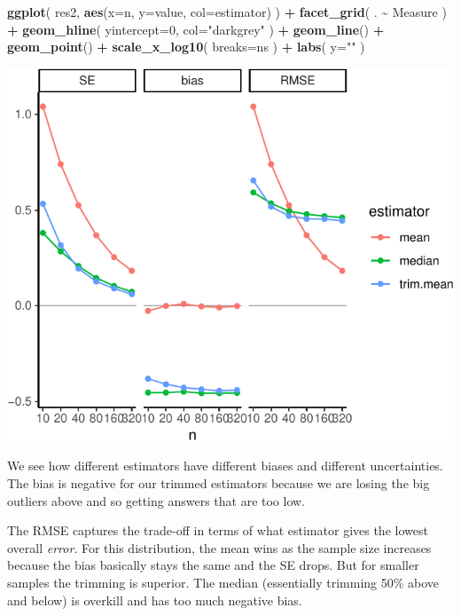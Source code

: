 \documentclass[
]{book}
\newenvironment{Shaded}{\begin{snugshade}}{\end{snugshade}}
\newcommand{\AttributeTok}[1]{\textcolor[rgb]{0.13,0.29,0.53}{#1}}
\newcommand{\DecValTok}[1]{\textcolor[rgb]{0.00,0.00,0.81}{#1}}
\newcommand{\FunctionTok}[1]{\textcolor[rgb]{0.13,0.29,0.53}{\textbf{#1}}}
\newcommand{\NormalTok}[1]{#1}
\newcommand{\SpecialCharTok}[1]{\textcolor[rgb]{0.81,0.36,0.00}{\textbf{#1}}}
\newcommand{\StringTok}[1]{\textcolor[rgb]{0.31,0.60,0.02}{#1}}
\begin{document}
\begin{Shaded}
\begin{Highlighting}[]
\FunctionTok{ggplot}\NormalTok{( res2, }\FunctionTok{aes}\NormalTok{(}\AttributeTok{x=}\NormalTok{n, }\AttributeTok{y=}\NormalTok{value, }\AttributeTok{col=}\NormalTok{estimator) ) }\SpecialCharTok{+}
    \FunctionTok{facet\_grid}\NormalTok{( . }\SpecialCharTok{\textasciitilde{}}\NormalTok{ Measure ) }\SpecialCharTok{+}
    \FunctionTok{geom\_hline}\NormalTok{( }\AttributeTok{yintercept=}\DecValTok{0}\NormalTok{, }\AttributeTok{col=}\StringTok{"darkgrey"}\NormalTok{ ) }\SpecialCharTok{+}
    \FunctionTok{geom\_line}\NormalTok{() }\SpecialCharTok{+} \FunctionTok{geom\_point}\NormalTok{() }\SpecialCharTok{+}
    \FunctionTok{scale\_x\_log10}\NormalTok{( }\AttributeTok{breaks=}\NormalTok{ns ) }\SpecialCharTok{+}
    \FunctionTok{labs}\NormalTok{( }\AttributeTok{y=}\StringTok{""}\NormalTok{ )}
\end{Highlighting}
\end{Shaded}

\begin{center}\includegraphics[width=0.75\linewidth]{Designing-Simulations-in-R_files/figure-latex/unnamed-chunk-198-1} \end{center}

We see how different estimators have different biases and different
uncertainties. The bias is negative for our trimmed estimators because we
are losing the big outliers above and so getting answers that are too low.

The RMSE captures the trade-off in terms of what estimator gives the lowest
overall \emph{error}. For this distribution, the mean wins as the sample size
increases because the bias basically stays the same and the SE drops. But
for smaller samples the trimming is superior. The median (essentially
trimming 50\% above and below) is overkill and has too much negative bias.
\end{document}
